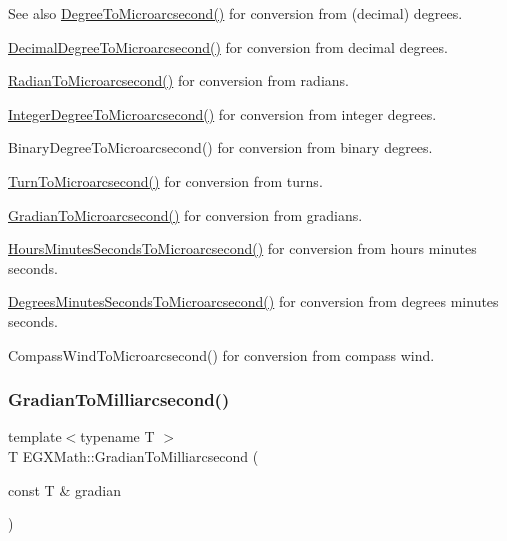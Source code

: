 \begin{DoxySeeAlso}{See also}
\mbox{\hyperlink{group___e_g_x_math-_conversions-_angle_conversions-_degree_ga31b65388fe1b4656663b3d66b9d764e6}{Degree\+To\+Microarcsecond()}} for conversion from (decimal) degrees. 

\mbox{\hyperlink{group___e_g_x_math-_conversions-_angle_conversions-_decimal_degree_ga6fa88456069907fd24716fa575517571}{Decimal\+Degree\+To\+Microarcsecond()}} for conversion from decimal degrees. 

\mbox{\hyperlink{group___e_g_x_math-_conversions-_angle_conversions-_radian_ga3a515ca2838a305fa40750763f546a86}{Radian\+To\+Microarcsecond()}} for conversion from radians. 

\mbox{\hyperlink{group___e_g_x_math-_conversions-_angle_conversions-_integer_degree_ga69179d6082764595c7014805e1f6b31e}{Integer\+Degree\+To\+Microarcsecond()}} for conversion from integer degrees. 

Binary\+Degree\+To\+Microarcsecond() for conversion from binary degrees. 

\mbox{\hyperlink{group___e_g_x_math-_conversions-_angle_conversions-_turn_ga41a861a04d65aab05647b32142e6d80d}{Turn\+To\+Microarcsecond()}} for conversion from turns. 

\mbox{\hyperlink{group___e_g_x_math-_conversions-_angle_conversions-_gradian_gab7781c860ea3ab9c9cf76ab639846a07}{Gradian\+To\+Microarcsecond()}} for conversion from gradians. 

\mbox{\hyperlink{group___e_g_x_math-_conversions-_angle_conversions-_hours_minutes_seconds_ga061e4fa10d73e459d5f411cfe436bbe3}{Hours\+Minutes\+Seconds\+To\+Microarcsecond()}} for conversion from hours minutes seconds. 

\mbox{\hyperlink{group___e_g_x_math-_conversions-_angle_conversions-_degrees_minutes_seconds_gabc4de7934e776de13953707344a4da88}{Degrees\+Minutes\+Seconds\+To\+Microarcsecond()}} for conversion from degrees minutes seconds. 

Compass\+Wind\+To\+Microarcsecond() for conversion from compass wind. 
\end{DoxySeeAlso}
\mbox{\label{group___e_g_x_math-_conversions-_angle_conversions-_gradian_gad77ea0956413029f4166dce8d7f5ce83}} 
\subsubsection{\texorpdfstring{Gradian\+To\+Milliarcsecond()}{GradianToMilliarcsecond()}}
{\footnotesize\ttfamily template$<$typename T $>$ \\
T E\+G\+X\+Math\+::\+Gradian\+To\+Milliarcsecond (\begin{DoxyParamCaption}\item[{const T \&}]{gradian }\end{DoxyParamCaption})}



